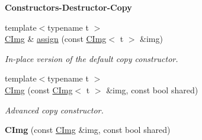 \begin{Indent}{\bf Constructors-\/Destructor-\/Copy}
\begin{DoxyCompactItemize}
\item 
{\footnotesize template$<$typename t $>$ }\\\hyperlink{structcimg__library_1_1_c_img}{CImg} \& \hyperlink{structcimg__library_1_1_c_img_ae8018950a740a3e76878727fdcb03076}{assign} (const \hyperlink{structcimg__library_1_1_c_img}{CImg}$<$ t $>$ \&img)
\begin{DoxyCompactList}\small\item\em In-\/place version of the default copy constructor. \item\end{DoxyCompactList}\item 
{\footnotesize template$<$typename t $>$ }\\\hyperlink{structcimg__library_1_1_c_img_a91826df0d3bf6569c39ae07705ea43d4}{CImg} (const \hyperlink{structcimg__library_1_1_c_img}{CImg}$<$ t $>$ \&img, const bool shared)
\begin{DoxyCompactList}\small\item\em Advanced copy constructor. \item\end{DoxyCompactList}\item 
\hypertarget{structcimg__library_1_1_c_img_a465b4e6c2064989dadd85183c7cdd7e6}{
{\bfseries CImg} (const \hyperlink{structcimg__library_1_1_c_img}{CImg} \&img, const bool shared)}
\label{structcimg__library_1_1_c_img_a465b4e6c2064989dadd85183c7cdd7e6}


\end{DoxyCompactItemize}
\end{Indent}
